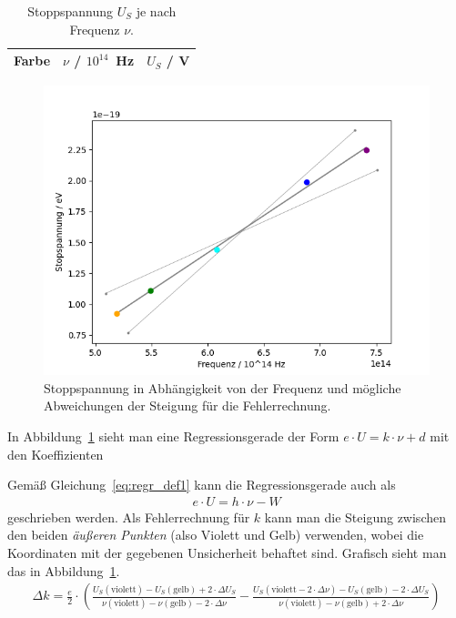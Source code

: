 \documentclass{article}
\begin{document}
\begin{table}[H]
\caption{Stoppspannung $U_S$ je nach Frequenz $\nu$.}
\begin{tabular}{l|r|r}
Farbe & $\nu$ / $10^{14}$~Hz  & $U_S$ / V \\
\hline

\end{tabular}
\label{tab:null}
\end{table}


\begin{figure}[H]
\center
\includegraphics[scale=0.7]{regression.png}
\caption{Stoppspannung in Abhängigkeit von der Frequenz und mögliche Abweichungen der Steigung für die Fehlerrechnung.}
\label{fig:stopspannung_regression}
\end{figure}
In Abbildung~\ref{fig:stopspannung_regression} sieht man eine Regressionsgerade der Form $e\cdot U = k\cdot \nu + d$ mit den Koeffizienten


Gemäß Gleichung~\eqref{eq:regr_def1} kann die Regressionsgerade auch als 
\begin{align*}
e\cdot U = h\cdot \nu - W
\end{align*}
geschrieben werden. Als Fehlerrechnung für $k$ kann man die Steigung zwischen den beiden \textit{äußeren Punkten} (also Violett und Gelb) verwenden, wobei die Koordinaten mit der gegebenen Unsicherheit behaftet sind. Grafisch sieht man das in Abbildung~\ref{fig:stopspannung_regression}.
\begin{align*}
\Delta k = \frac{e}{2}\cdot\left( \frac{ U_S(\text{violett}) - U_S(\text{gelb}) + 2\cdot \Delta U_S}{\nu(\text{violett}) - \nu(\text{gelb})- 2\cdot \Delta \nu} - \frac{ U_S(\text{violett} - 2\cdot \Delta \nu) - U_S(\text{gelb}) - 2\cdot \Delta U_S}{\nu(\text{violett}) - \nu(\text{gelb}) + 2\cdot \Delta \nu}\right)
\end{align*}
\end{document}

